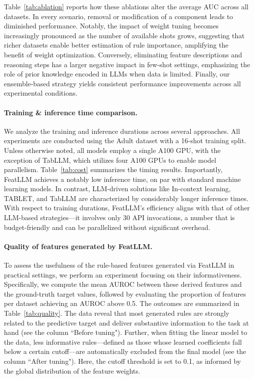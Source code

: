 Table~\ref{tab:ablation} reports how these ablations alter the average AUC across all datasets. In every scenario, removal or modification of a component leads to diminished performance. Notably, the impact of weight tuning becomes increasingly pronounced as the number of available shots grows, suggesting that richer datasets enable better estimation of rule importance, amplifying the benefit of weight optimization. Conversely, eliminating feature descriptions and reasoning steps has a larger negative impact in few-shot settings, emphasizing the role of prior knowledge encoded in LLMs when data is limited. Finally, our ensemble-based strategy yields consistent performance improvements across all experimental conditions.

\vspace*{-0.12in}
\paragraph{Training \& inference time comparison.} We analyze the training and inference durations across several approaches. All experiments are conducted using the Adult dataset with a 16-shot training split. Unless otherwise noted, all models employ a single A100 GPU, with the exception of TabLLM, which utilizes four A100 GPUs to enable model parallelism. Table~\ref{tab:cost} summarizes the timing results. Importantly, \textsf{FeatLLM} achieves a notably low inference time, on par with standard machine learning models. In contrast, LLM-driven solutions like In-context learning, TABLET, and TabLLM are characterized by considerably longer inference times. With respect to training durations, \textsf{FeatLLM}'s efficiency aligns with that of other LLM-based strategies—it involves only 30 API invocations, a number that is budget-friendly and can be parallelized without significant overhead.

\vspace*{-0.12in}
\paragraph{Quality of features generated by \textsf{FeatLLM}.}
To assess the usefulness of the rule-based features generated via \textsf{FeatLLM} in practical settings, we perform an experiment focusing on their informativeness. Specifically, we compute the mean AUROC between these derived features and the ground-truth target values, followed by evaluating the proportion of features per dataset achieving an AUROC above 0.5. The outcomes are summarized in Table~\ref{tab:quality}. The data reveal that most generated rules are strongly related to the predictive target and deliver substantive information to the task at hand (see the column ``Before tuning"). Further, when fitting the linear model to the data, less informative rules—defined as those whose learned coefficients fall below a certain cutoff—are automatically excluded from the final model (see the column ``After tuning"). Here, the cutoff threshold is set to 0.1, as informed by the global distribution of the feature weights.

